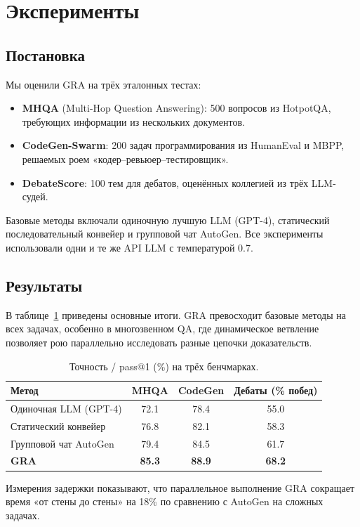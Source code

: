 \documentclass[11pt]{article}
\begin{document}
\section{Эксперименты}
\subsection{Постановка}
Мы оценили GRA на трёх эталонных тестах:
\begin{itemize}
    \item \textbf{MHQA} (Multi-Hop Question Answering): 500 вопросов из HotpotQA, требующих информации из нескольких документов.
    \item \textbf{CodeGen-Swarm}: 200 задач программирования из HumanEval и MBPP, решаемых роем «кодер--ревьюер--тестировщик».
    \item \textbf{DebateScore}: 100 тем для дебатов, оценённых коллегией из трёх LLM-судей.
\end{itemize}
Базовые методы включали одиночную лучшую LLM (GPT-4), статический последовательный конвейер и групповой чат AutoGen.
Все эксперименты использовали одни и те же API LLM с температурой 0.7.

\subsection{Результаты}
В таблице~\ref{tab:results} приведены основные итоги.
GRA превосходит базовые методы на всех задачах, особенно в многозвенном QA, где динамическое ветвление позволяет рою параллельно исследовать разные цепочки доказательств.

\begin{table}[htbp]
\centering
\caption{Точность / pass@1 (\%) на трёх бенчмарках.}
\label{tab:results}
\begin{tabular}{lccc}
\toprule
\textbf{Метод} & \textbf{MHQA} & \textbf{CodeGen} & \textbf{Дебаты (\% побед)} \\
\midrule
Одиночная LLM (GPT-4) & 72.1 & 78.4 & 55.0 \\
Статический конвейер   & 76.8 & 82.1 & 58.3 \\
Групповой чат AutoGen   & 79.4 & 84.5 & 61.7 \\
\textbf{GRA}            & \textbf{85.3} & \textbf{88.9} & \textbf{68.2} \\
\bottomrule
\end{tabular}
\end{table}

Измерения задержки показывают, что параллельное выполнение GRA сокращает время «от стены до стены» на 18\% по сравнению с AutoGen на сложных задачах.
\end{document}
